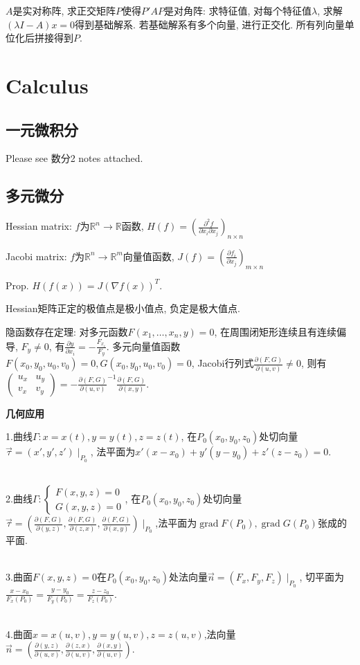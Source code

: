 \documentclass[UTF8]{ctexart}
\begin{document}
$A$是实对称阵, 求正交矩阵$P$使得$P'AP$是对角阵:
求特征值, 对每个特征值$\lambda$, 求解$(\lambda I-A)x=0$得到基础解系.
若基础解系有多个向量, 进行正交化.
所有列向量单位化后拼接得到$P$.

\section{Calculus}

\subsection{一元微积分}
Please see 数分2 notes attached.


\subsection{多元微分}

Hessian matrix: $f$为$\mathbb{R}^n\to\mathbb{R}$函数,
$H(f)=\left(\frac{\partial^2 f}{\partial x_i \partial x_j}\right)_{n\times n}$

Jacobi matrix: $f$为$\mathbb{R}^n\to \mathbb{R}^m$向量值函数,
$J(f)=\left(\frac{\partial f_i}{\partial x_j}\right)_{m\times n}$

Prop. $H(f(x))=J(\nabla f(x))^T$.

Hessian矩阵正定的极值点是极小值点, 负定是极大值点.

隐函数存在定理:
对多元函数$F(x_1,\dots,x_n,y)=0$, 在周围闭矩形连续且有连续偏导, $F_y\neq 0$, 有$\frac{\partial y}{\partial x_i}=-\frac{F_{x_i}}{F_y}$.
多元向量值函数$F(x_0,y_0,u_0,v_0)=0, G(x_0,y_0,u_0,v_0)=0$, Jacobi行列式$\frac{\partial(F,G)}{\partial(u,v)}\neq 0$,
则有$\begin{pmatrix} u_x & u_y \\ v_x  & v_y \end{pmatrix} = -\frac{\partial(F,G)}{\partial(u,v)} ^{-1}\frac{\partial(F,G)}{\partial(x,y)}$.


\noindent \textbf{几何应用}

\noindent 1.曲线$\Gamma: x=x(t),y=y(t),z=z(t)$,
在$P_0(x_0,y_0,z_0)$处切向量$\vec{\tau}=(x',y',z')\mid _{P_0}$,
法平面为$x'(x-x_0)+y'(y-y_0)+z'(z-z_0)= 0$.\par
~\\
\noindent 2.曲线$\Gamma: \left\{\begin{array}{l}
		F(x, y, z)=0 \\ G(x, y, z)=0\end{array}\right.$,
在$P_0(x_0,y_0,z_0)$处切向量$\vec{\tau}=(\frac{\partial (F,G)}{\partial (y,z)},
	\frac{\partial (F,G)}{\partial (z,x)}, \frac{\partial (F,G)}{\partial (x,y)})
	\mid _{P_0}$,法平面为$\operatorname{grad}F(P_0),\operatorname{grad}G(P_0)$张成的平面.\par
~\\
\noindent 3.曲面$F(x,y,z)=0$在$P_0(x_0,y_0,z_0)$处法向量$\vec{n}=(F_x,F_y,F_z)\mid _{P_0}$,
切平面为$\frac{x-x_0}{F_x(P_0)}=\frac{y-y_0}{F_y(P_0)}=\frac{z-z_0}{F_z(P_0)}$.\par
~\\
\noindent 4.曲面$x=x(u,v),y=y(u,v),z=z(u,v)$,法向量$\vec{n}=(
	\frac{\partial (y,z)}{\partial (u,v)},\frac{\partial (z,x)}{\partial (u,v)},\frac{\partial (x,y)}{\partial (u,v)})$.
\end{document}
